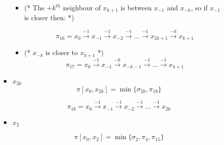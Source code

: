 \begin{itemize}
\begin{enumerate}
\begin{itemize}
\begin{itemize}
\item  (* The $+k^{th}$ neighbour of $x_{k+1}$  is between $x_{-1}$ and $x_{-k}$, so 
if $x_{-1}$ is closer then: *)

   $$\pi_{16} = x_{0} \xrightarrow {-1} x_{-1} \xrightarrow {-1} x_{-2} \xrightarrow {-1} ... \xrightarrow {-1} x_{2k+1}\xrightarrow {-k} x_{k+1}$$ %

 \item (*  $x_{-k}$  is closer to $x_{k+1}$  *)
$$\pi_{17} = x_{0} \xrightarrow {-1} x_{-1} \xrightarrow {-k} x_{-k-1} \xrightarrow {-1} ... \xrightarrow {-1} x_{k+1}$$ 
\end{itemize}


 \item $x_{2k}$
   $$ \pi[x_0,x_{2k}] = \min \{   \sigma_{2k}, \pi_{18}\}$$

 
$$ \pi_{18} = x_{0} \xrightarrow {-1} x_{-1} \xrightarrow {-1} x_{-2} \xrightarrow {-1} ... \xrightarrow {-1} x_{2k}$$ %
 
 
 \item $x_{2}$
 
   $$ \pi[x_0,x_{2}] = \min \{   \sigma_{2},\pi_{4},\pi_{15}\}$$




\end{itemize}

\end{enumerate}
\end{itemize}

 

